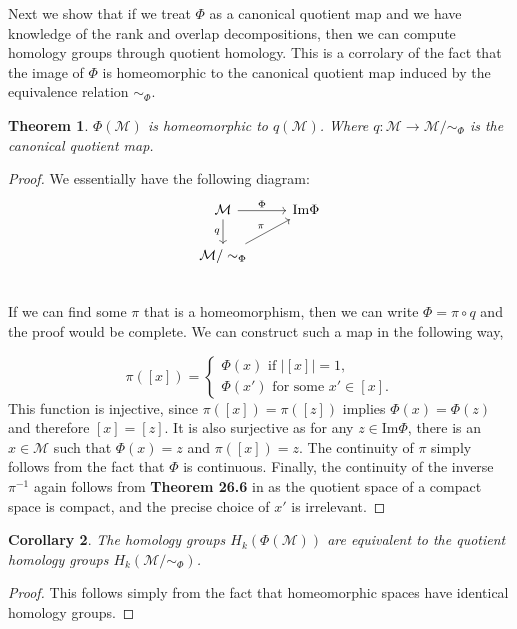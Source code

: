 \documentclass[10pt]{article} %
\theoremstyle{plain}
\newtheorem{theorem}{Theorem}[section]
\newtheorem{corollary}[theorem]{Corollary}
\theoremstyle{definition}
\theoremstyle{remark}
\begin{document}
Next we show that if we treat $\Phi$ as a canonical quotient map and we have knowledge of the rank and overlap decompositions, then we can compute homology groups through quotient homology. This is a corrolary of the fact that the image of $\Phi$ is homeomorphic to the canonical quotient map induced by the equivalence relation $\sim_\Phi$.
\begin{theorem}
    $\Phi(\mathcal{M})$ is homeomorphic to $q(\mathcal{M})$. Where $q:\mathcal{M} \to \mathcal{M}/\sim_\Phi$ is the canonical quotient map.
\end{theorem}

\begin{proof}
    We essentially have the following diagram: 
    \begin{equation*}
        \begin{tikzcd}
        \mathcal{M} \arrow[r, "\Phi"] \arrow[d, "q"']
        & \text{Im}\Phi  \\
        \mathcal{M}/\sim_\Phi \arrow[ru, "\pi"]\\
    \end{tikzcd}
    \end{equation*}
    If we can find some $\pi$ that is a homeomorphism, then we can write $\Phi = \pi \circ q$ and the proof would be complete. We can construct such a map in the following way,

    \begin{equation*}
        \pi([x]) = 
        \begin{cases}
            \Phi(x) \text{ if } |[x]|=1, \\
            \Phi(x') \text{ for some } x' \in [x].
        \end{cases}
    \end{equation*}
    This function is injective, since $\pi([x])=\pi([z])$ implies $\Phi(x)=\Phi(z)$ and therefore $[x]=[z]$. It is also surjective as for any $z \in \text{Im}\Phi$, there is an $x \in \mathcal{M}$ such that $\Phi(x) = z$ and $\pi([x]) = z$. The continuity of $\pi$ simply follows from the fact that $\Phi$ is continuous. Finally, the continuity of the inverse $\pi^{-1}$ again follows from \textbf{Theorem 26.6} in \citet{munkres200} as the quotient space of a compact space is compact,
    and the precise choice of $x'$ is irrelevant.
\end{proof}

\begin{corollary}
    The homology groups $H_k(\Phi(\mathcal{M}))$ are equivalent to the quotient homology groups $H_k(\mathcal{M}/ \sim_\Phi)$.
\end{corollary}
\begin{proof}
    This follows simply from the fact that homeomorphic spaces have identical homology groups.
\end{proof}
\end{document}
